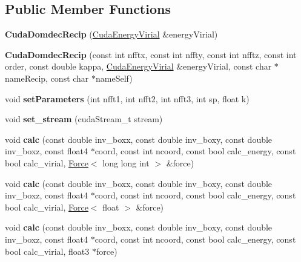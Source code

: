 \subsection*{Public Member Functions}
\begin{DoxyCompactItemize}
\item 
\hypertarget{classCudaDomdecRecip_adaa2c67c3f03b4088290625e8bd9f74e}{}\label{classCudaDomdecRecip_adaa2c67c3f03b4088290625e8bd9f74e} 
{\bfseries Cuda\+Domdec\+Recip} (\hyperlink{classCudaEnergyVirial}{Cuda\+Energy\+Virial} \&energy\+Virial)
\item 
\hypertarget{classCudaDomdecRecip_a24e6d5cb0a64a025aeb1fdee6a821a75}{}\label{classCudaDomdecRecip_a24e6d5cb0a64a025aeb1fdee6a821a75} 
{\bfseries Cuda\+Domdec\+Recip} (const int nfftx, const int nffty, const int nfftz, const int order, const double kappa, \hyperlink{classCudaEnergyVirial}{Cuda\+Energy\+Virial} \&energy\+Virial, const char $\ast$name\+Recip, const char $\ast$name\+Self)
\item 
\hypertarget{classCudaDomdecRecip_a96ef44bed53448a42f5a9157a865741a}{}\label{classCudaDomdecRecip_a96ef44bed53448a42f5a9157a865741a} 
void {\bfseries set\+Parameters} (int nfft1, int nfft2, int nfft3, int sp, float k)
\item 
\hypertarget{classCudaDomdecRecip_a1cbec44daee4593e45008969ac6bc9a8}{}\label{classCudaDomdecRecip_a1cbec44daee4593e45008969ac6bc9a8} 
void {\bfseries set\+\_\+stream} (cuda\+Stream\+\_\+t stream)
\item 
\hypertarget{classCudaDomdecRecip_a6d0eac7f0a171854b40d2803e16c2283}{}\label{classCudaDomdecRecip_a6d0eac7f0a171854b40d2803e16c2283} 
void {\bfseries calc} (const double inv\+\_\+boxx, const double inv\+\_\+boxy, const double inv\+\_\+boxz, const float4 $\ast$coord, const int ncoord, const bool calc\+\_\+energy, const bool calc\+\_\+virial, \hyperlink{classForce}{Force}$<$ long long int $>$ \&force)
\item 
\hypertarget{classCudaDomdecRecip_a3d21fc32f495b991c3cd24cd5c133215}{}\label{classCudaDomdecRecip_a3d21fc32f495b991c3cd24cd5c133215} 
void {\bfseries calc} (const double inv\+\_\+boxx, const double inv\+\_\+boxy, const double inv\+\_\+boxz, const float4 $\ast$coord, const int ncoord, const bool calc\+\_\+energy, const bool calc\+\_\+virial, \hyperlink{classForce}{Force}$<$ float $>$ \&force)
\item 
\hypertarget{classCudaDomdecRecip_aaaf9f7a2192c4a6a7293a7ed75071bc8}{}\label{classCudaDomdecRecip_aaaf9f7a2192c4a6a7293a7ed75071bc8} 
void {\bfseries calc} (const double inv\+\_\+boxx, const double inv\+\_\+boxy, const double inv\+\_\+boxz, const float4 $\ast$coord, const int ncoord, const bool calc\+\_\+energy, const bool calc\+\_\+virial, float3 $\ast$force)

\end{DoxyCompactItemize}

